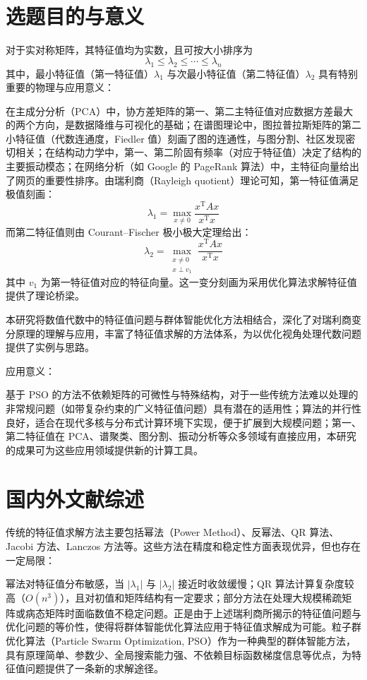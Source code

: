 \section{选题目的与意义}

对于实对称矩阵，其特征值均为实数，且可按大小排序为
\[
\lambda_1 \leq \lambda_2 \leq \cdots \leq \lambda_n
\]
其中，最小特征值（第一特征值）$\lambda_1$ 与次最小特征值（第二特征值）$\lambda_2$ 具有特别重要的物理与应用意义：

在主成分分析（PCA）中，协方差矩阵的第一、第二主特征值对应数据方差最大的两个方向，是数据降维与可视化的基础；在谱图理论中，图拉普拉斯矩阵的第二小特征值（代数连通度，Fiedler 值）刻画了图的连通性，与图分割、社区发现密切相关；在结构动力学中，第一、第二阶固有频率（对应于特征值）决定了结构的主要振动模态；在网络分析（如 Google 的 PageRank 算法）中，主特征向量给出了网页的重要性排序。由瑞利商（Rayleigh quotient）理论可知，第一特征值满足极值刻画：
\[
\lambda_1 = \max_{x \neq 0} \frac{x^{\mathrm{T}} A x}{x^{\mathrm{T}} x}
\]
而第二特征值则由 Courant--Fischer 极小极大定理给出：
\[
\lambda_2 = \max_{\substack{x \neq 0 \\ x \perp v_1}} \frac{x^{\mathrm{T}} A x}{x^{\mathrm{T}} x}
\]
其中 $v_1$ 为第一特征值对应的特征向量。这一变分刻画为采用优化算法求解特征值提供了理论桥梁。

本研究将数值代数中的特征值问题与群体智能优化方法相结合，深化了对瑞利商变分原理的理解与应用，丰富了特征值求解的方法体系，为以优化视角处理代数问题提供了实例与思路。

应用意义：

基于 PSO 的方法不依赖矩阵的可微性与特殊结构，对于一些传统方法难以处理的非常规问题（如带复杂约束的广义特征值问题）具有潜在的适用性；算法的并行性良好，适合在现代多核与分布式计算环境下实现，便于扩展到大规模问题；第一、第二特征值在 PCA、谱聚类、图分割、振动分析等众多领域有直接应用，本研究的成果可为这些应用领域提供新的计算工具。

\section{国内外文献综述}

传统的特征值求解方法主要包括幂法（Power Method）、反幂法、QR 算法、Jacobi 方法、Lanczos 方法等。这些方法在精度和稳定性方面表现优异，但也存在一定局限：

幂法对特征值分布敏感，当 $|\lambda_1|$ 与 $|\lambda_2|$ 接近时收敛缓慢；QR 算法计算复杂度较高（$O(n^3)$），且对初值和矩阵结构有一定要求；部分方法在处理大规模稀疏矩阵或病态矩阵时面临数值不稳定问题。正是由于上述瑞利商所揭示的特征值问题与优化问题的等价性，使得将群体智能优化算法应用于特征值求解成为可能。粒子群优化算法（Particle Swarm Optimization, PSO）作为一种典型的群体智能方法，具有原理简单、参数少、全局搜索能力强、不依赖目标函数梯度信息等优点，为特征值问题提供了一条新的求解途径。

